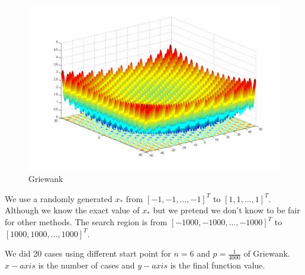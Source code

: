 \documentclass[letterpaper,12pt,titlepage,oneside,final]{book}
\begin{document}
\begin{figure}[H]
\includegraphics[scale=1.1]{griewank.jpg}
\caption{Griewank}
\end{figure}

We use a randomly generated $x_*$ from $[-1,-1,...,-1]^T$ to $[1,1,...,1]^T$. Although we know the exact value of $x_*$ but we pretend we don't know to be fair for other methods. The search region is from $[-1000,-1000,...,-1000]^T$ to $[1000,1000,...,1000]^T$.

We did 20 cases using different start point for $n=6$ and $p=\frac{1}{4000}$ of Griewank. $x-axis$ is the number of cases and $y-axis$ is the final function value. 
\end{document}
